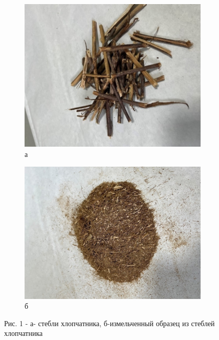 \begin{figure}[H]
    \centering
    \begin{subfigure}[b]{0.32\textwidth}
        \centering
        \includegraphics[height=0.9\textwidth]{assets/75}
        \caption*{а}
    \end{subfigure}
    \hspace{2em}
    \begin{subfigure}[b]{0.32\textwidth}
        \centering
        \includegraphics[height=0.9\textwidth]{assets/76}
        \caption*{б}
    \end{subfigure}
    \caption*{Рис. 1 - а- стебли хлопчатника, б-измельченный образец из стеблей хлопчатника}
\end{figure}

